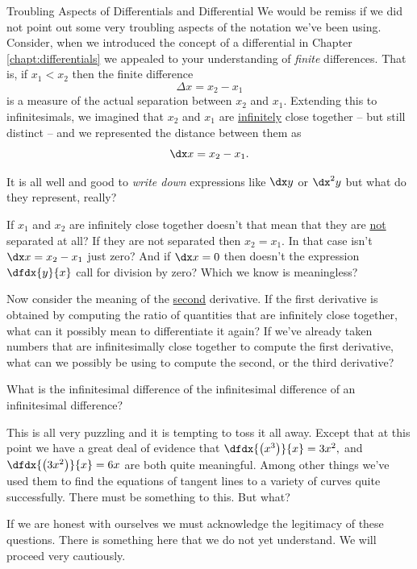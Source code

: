 \begin{mynotation}{Troubling Aspects of Differentials and Differential}
  We would be remiss if we did not point out some very troubling
  aspects of the  notation we've been using.
  Consider, when we introduced the concept of a differential in
  Chapter \ref{chapt:differentials} we appealed to your understanding
  of \emph{finite} differences. That is, if $x_1\lt{}x_2$ then the finite
  difference
$$
\Delta{}x=x_2-x_1
$$
is a measure of the actual separation between $x_2$ and $x_1.$
Extending this to infinitesimals,  we imagined that $x_2$ and $x_1$ are
\underline{infinitely} close together -- but still distinct -- and we
represented the distance between them as
$$
\dx x = x_2-x_1.
$$

It is all well and good to \emph{write down} expressions like $\dx y$
or $\dx^2 y$ but what do they represent, really?

If $x_1$ and $x_2$ are infinitely close together doesn't that mean
that they are \underline{not} separated at all? If they are not
separated then $x_2=x_1.$ In that case isn't $\dx x =x_2-x_1$ just
zero? And if $\dx x =0$ then doesn't the expression $\dfdx{y}{x}$ call
for division by zero? Which we know is meaningless?

Now consider the meaning of the \underline{second} derivative. If the
first derivative is obtained by computing the ratio of quantities that
are infinitely close together, what can it possibly mean to
differentiate it again? If we've already taken numbers that are
infinitesimally close together to compute the first derivative, what
can we possibly be using to compute the second, or the third
derivative?

What is the infinitesimal difference of the infinitesimal difference of
an infinitesimal difference?

This is all very puzzling and it is tempting to toss it all away.
Except that at this point we have a great deal of evidence that
$\dfdx{\left(x^3\right)}{x}=3x^2,$ and
$\dfdx{\left(3x^2\right)}{x}=6x$ are both quite meaningful. Among
other things we've used them to find the equations of tangent lines to
a variety of curves quite successfully. There must be something to
this. But what?

If we are honest with ourselves we must acknowledge the legitimacy of
these questions. There is something here that we do not yet
understand. We will proceed very cautiously.
\end{mynotation}


